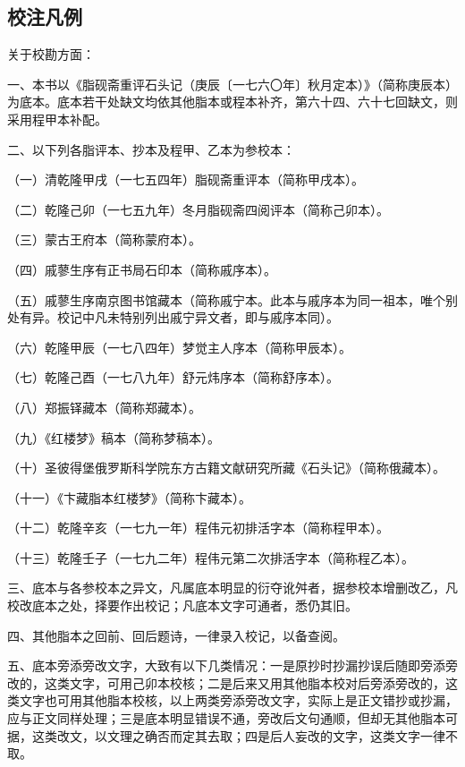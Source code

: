 \clearpage
\subsection*{校注凡例}


\par 关于校勘方面：
\par 一、本书以《脂砚斋重评石头记（庚辰〔一七六〇年〕秋月定本）》（简称庚辰本）为底本。底本若干处缺文均依其他脂本或程本补齐，第六十四、六十七回缺文，则采用程甲本补配。
\par 二、以下列各脂评本、抄本及程甲、乙本为参校本：
\par （一）清乾隆甲戌（一七五四年）脂砚斋重评本（简称甲戌本）。
\par （二）乾隆己卯（一七五九年）冬月脂砚斋四阅评本（简称己卯本）。
\par （三）蒙古王府本（简称蒙府本）。
\par （四）戚蓼生序有正书局石印本（简称戚序本）。
\par （五）戚蓼生序南京图书馆藏本（简称戚宁本。此本与戚序本为同一祖本，唯个别处有异。校记中凡未特别列出戚宁异文者，即与戚序本同）。
\par （六）乾隆甲辰（一七八四年）梦觉主人序本（简称甲辰本）。
\par （七）乾隆己酉（一七八九年）舒元炜序本（简称舒序本）。
\par （八）郑振铎藏本（简称郑藏本）。
\par （九）《红楼梦》稿本（简称梦稿本）。
\par （十）圣彼得堡俄罗斯科学院东方古籍文献研究所藏《石头记》（简称俄藏本）。
\par （十一）《卞藏脂本红楼梦》（简称卞藏本）。
\par （十二）乾隆辛亥（一七九一年）程伟元初排活字本（简称程甲本）。
\par （十三）乾隆壬子（一七九二年）程伟元第二次排活字本（简称程乙本）。
\par 三、底本与各参校本之异文，凡属底本明显的衍夺讹舛者，据参校本增删改乙，凡校改底本之处，择要作出校记；凡底本文字可通者，悉仍其旧。
\par 四、其他脂本之回前、回后题诗，一律录入校记，以备查阅。
\par 五、底本旁添旁改文字，大致有以下几类情况：一是原抄时抄漏抄误后随即旁添旁改的，这类文字，可用己卯本校核；二是后来又用其他脂本校对后旁添旁改的，这类文字也可用其他脂本校核，以上两类旁添旁改文字，实际上是正文错抄或抄漏，应与正文同样处理；三是底本明显错误不通，旁改后文句通顺，但却无其他脂本可据，这类改文，以文理之确否而定其去取；四是后人妄改的文字，这类文字一律不取。
